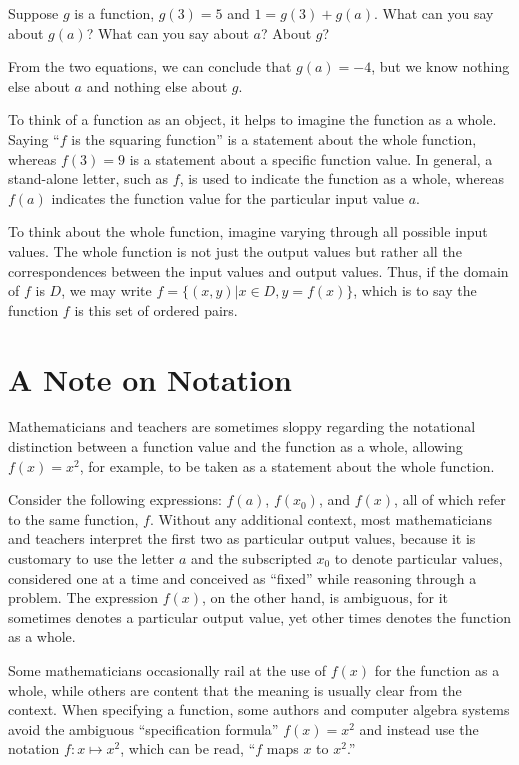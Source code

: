 \documentclass{ximera}
\begin{document}
\begin{question}
Suppose $g$ is a function, $g(3) = 5$ and $1=g(3)+g(a)$.  What can you say about $g(a)$?  What can you say about $a$?  About $g$?
\begin{freeResponse}
\begin{hint}
From the two equations, we can conclude that $g(a)=-4$, but we know nothing else about $a$ and nothing else about $g$.  
\end{hint}
\end{freeResponse}
\end{question}

To think of a function as an object, it helps to imagine the function as a whole.  Saying ``$f$ is the squaring function'' is a statement about the whole function, whereas $f(3) = 9$ is a statement about a specific function value.  In general, a stand-alone letter, such as $f$, is used to indicate the function as a whole, whereas $f(a)$ indicates the function value for the particular input value $a$.  

To think about the whole function, imagine varying through all possible input values.  The whole function is not just the output values but rather all the correspondences between the input values and output values.  Thus, if the domain of $f$ is $D$, we may write $f=\{(x,y) | x\in D, y=f(x)\}$, which is to say the function $f$ is this set of ordered pairs.  

\section*{A Note on Notation}
Mathematicians and teachers are sometimes sloppy regarding the notational distinction between a function value and the function as a whole, allowing $f(x)=x^2$, for example, to be taken as a statement about the whole function. 

Consider the following expressions:  $f(a)$, $f(x_0)$, and $f(x)$, all of which refer to the same function, $f$.  Without any additional context, most mathematicians and teachers interpret the first two as particular output values, because it is customary to use the letter $a$ and the subscripted $x_0$ to denote particular values, considered one at a time and conceived as ``fixed'' while reasoning through a problem.  The expression $f(x)$, on the other hand, is ambiguous, for it sometimes denotes a particular output value, yet other times denotes the function as a whole.  

Some mathematicians occasionally rail at the use of  $f(x)$ for the function as a whole, while others are content that the meaning is usually clear from the context.  When specifying a function, some authors and computer algebra systems avoid the ambiguous ``specification formula'' $f(x)=x^2$ and instead use the notation $f: x\mapsto x^2$, which can be read, ``$f$ maps $x$ to $x^2$.''
\end{document}
